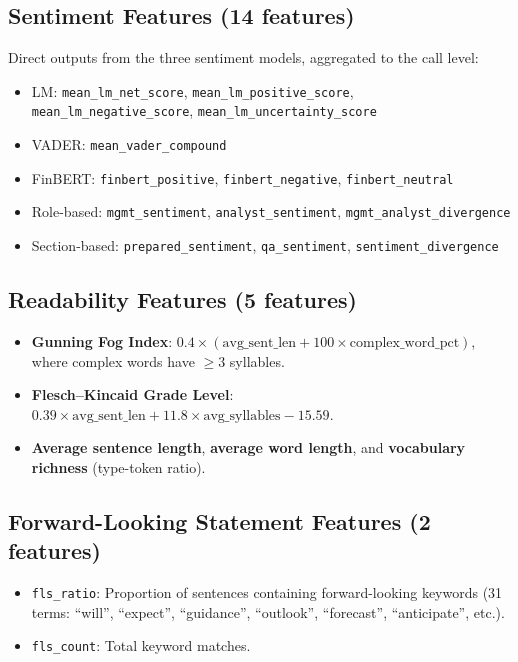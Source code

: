 \documentclass[12pt,a4paper]{article}
\begin{document}
\subsection{Sentiment Features (14 features)}

Direct outputs from the three sentiment models, aggregated to the call level:
\begin{itemize}[noitemsep]
    \item LM: \texttt{mean\_lm\_net\_score}, \texttt{mean\_lm\_positive\_score}, \texttt{mean\_lm\_negative\_score}, \texttt{mean\_lm\_uncertainty\_score}
    \item VADER: \texttt{mean\_vader\_compound}
    \item FinBERT: \texttt{finbert\_positive}, \texttt{finbert\_negative}, \texttt{finbert\_neutral}
    \item Role-based: \texttt{mgmt\_sentiment}, \texttt{analyst\_sentiment}, \texttt{mgmt\_analyst\_divergence}
    \item Section-based: \texttt{prepared\_sentiment}, \texttt{qa\_sentiment}, \texttt{sentiment\_divergence}
\end{itemize}

\subsection{Readability Features (5 features)}

\begin{itemize}[noitemsep]
    \item \textbf{Gunning Fog Index}: $0.4 \times (\text{avg\_sent\_len} + 100 \times \text{complex\_word\_pct})$, where complex words have $\geq 3$ syllables.
    \item \textbf{Flesch--Kincaid Grade Level}: $0.39 \times \text{avg\_sent\_len} + 11.8 \times \text{avg\_syllables} - 15.59$.
    \item \textbf{Average sentence length}, \textbf{average word length}, and \textbf{vocabulary richness} (type-token ratio).
\end{itemize}

\subsection{Forward-Looking Statement Features (2 features)}

\begin{itemize}[noitemsep]
    \item \texttt{fls\_ratio}: Proportion of sentences containing forward-looking keywords (31 terms: ``will'', ``expect'', ``guidance'', ``outlook'', ``forecast'', ``anticipate'', etc.).
    \item \texttt{fls\_count}: Total keyword matches.
\end{itemize}
\end{document}
